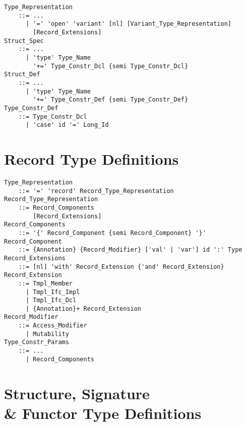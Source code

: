 \grammar\begin{lstlisting}
Type_Representation 
    ::= ...
      | '=' 'open' 'variant' [nl] [Variant_Type_Representation] 
        [Record_Extensions]
Struct_Spec
    ::= ...
      | 'type' Type_Name 
        '+=' Type_Constr_Dcl {semi Type_Constr_Dcl}
Struct_Def
    ::= ...
      | 'type' Type_Name
        '+=' Type_Constr_Def {semi Type_Constr_Def}
Type_Constr_Def
    ::= Type_Constr_Dcl 
      | 'case' id '=' Long_Id
\end{lstlisting}






\section{Record Type Definitions}
\label{sec:record-types}

\grammar\begin{lstlisting}
Type_Representation 
    ::= '=' 'record' Record_Type_Representation
Record_Type_Representation 
    ::= Record_Components 
        [Record_Extensions]
Record_Components 
    ::= '{' Record_Component {semi Record_Component} '}'
Record_Component 
    ::= {Annotation} {Record_Modifier} ['val' | 'var'] id ':' Type
Record_Extensions 
    ::= [nl] 'with' Record_Extension {'and' Record_Extension}
Record_Extension 
    ::= Tmpl_Member
      | Tmpl_Ifc_Impl
      | Tmpl_Ifc_Dcl
      | {Annotation}+ Record_Extension
Record_Modifier 
    ::= Access_Modifier 
      | Mutability
Type_Constr_Params
    ::= ...
      | Record_Components
\end{lstlisting}





\section[Structure, Signature \& Functor Type Definitions]{Structure, Signature \\\& Functor Type Definitions}
\label{sec:struct-types}

